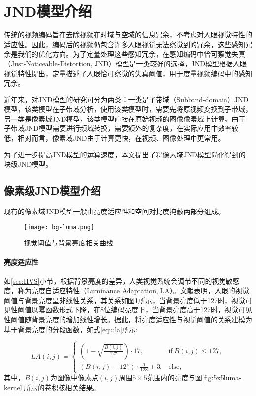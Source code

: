   \section{JND模型介绍}
  传统的视频编码旨在去除视频在时域与空域的信息冗余，不考虑对人眼视觉特性的适应性。因此，编码后的视频仍包含许多人眼视觉无法察觉到的冗余，这些感知冗余是我们的优化方向。为了定量处理这些感知冗余，在感知编码中恰可察觉失真（Just-Noticeable-Distortion, JND）模型是一类较好的选择，JND模型根据人眼视觉特性提出，定量描述了人眼恰可察觉的失真阈值，用于度量视频编码中的感知冗余。

  近年来，对JND模型的研究可分为两类：一类是子带域（Subband-domain）JND模型，该类模型在子带域分析，使用该类模型时，需要先将原视频变换到子带域，另一类是像素域JND模型，该类模型直接在原始视频的图像像素域上计算。由于子带域JND模型需要进行频域转换，需要额外的复杂度，在实际应用中效率较低，相对而言，像素域JND由于计算更快，在视频、图像处理中更常用。

  为了进一步提高JND模型的运算速度，本文提出了将像素域JND模型简化得到的块级JND模型。
  \subsection{像素级JND模型介绍}
  现有的像素域JND模型一般由亮度适应性和空间对比度掩蔽两部分组成。

  \begin{figure}[!htp]
		\centering
		\texttt{[image: bg-luma.png]}
		\caption{视觉阈值与背景亮度相关曲线\cite{chun-hsienchouPerceptuallyTunedSubband1995}}
		\label{fig:bg-luma}
	\end{figure}

  \paragraph{亮度适应性} 如\ref{sec:HVS}小节，根据背景亮度的差异，人类视觉系统会调节不同的视觉敏感度，称为亮度自适应特性（Luminance Adaptation, LA）。文献\cite{chun-hsienchouPerceptuallyTunedSubband1995}表明，人眼的视觉阈值与背景亮度呈非线性关系，其关系如图\ref{fig:bg-luma}所示，当背景亮度低于127时，视觉可见性阈值以幂函数形式下降，在8位编码亮度下，当背景亮度高于127时，视觉可见性阈值随背景亮度的增加线性增长。据此，将亮度适应性与视觉阈值的关系建模为基于背景亮度的分段函数\cite{chun-hsienchouPerceptuallyTunedSubband1995}，如式\ref{equ:la}所示:

  \begin{equation} \label{equ:la}
    LA(i, j) = \begin{cases}
      \left(1 - \sqrt{\frac{B(i, j)}{127}}\right) \cdot 17, &\mathrm{if}\: B(i, j)\leq 127, \\
      \left(B(i, j) - 127\right) \cdot \frac{3}{128} + 3, &\mathrm{else},
    \end{cases}
  \end{equation}
  其中，$B(i, j)$为图像中像素点$(i, j)$周围$5\times 5$范围内的亮度与图\ref{fig:5x5luma-kernel}所示的卷积核相关结果。

